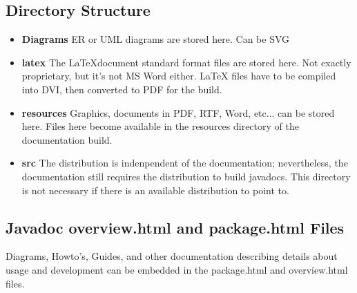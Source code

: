 \documentclass[12pt,notitlepage]{article}
\begin{document}
\begin{s5presentation}
\begin{ifhtml}
\begin{s5slide}
        \section{Directory Structure}
        \begin{itemize}
      \item \textbf{Diagrams}
        ER or UML diagrams are stored here. Can be SVG
      \item \textbf{latex}
        The \LaTeX document standard format files are stored here. Not exactly proprietary, but
        it's not MS Word either. LaTeX files have to be compiled into DVI, then converted to PDF for
        the build.
      \item \textbf{resources}
          Graphics, documents in PDF, RTF, Word, etc... can be stored here. Files here become
          available in the resources directory of the documentation build.
        \item \textbf{src}
          The distribution is indenpendent of the documentation; nevertheless, the 
          documentation still requires the distribution to build javadocs. This directory 
          is not necessary if there is an available distribution to point to.
      \end{itemize}
      \end{s5slide}
    \begin{s5slide}
      \section{Javadoc overview.html and package.html Files}
      Diagrams, Howto's, Guides, and other documentation describing details about usage and development 
      can be embedded in the package.html and overview.html files.
    \end{s5slide}
    \begin{s5slide}

\end{s5slide}
\end{ifhtml}
\end{s5presentation}
\end{document}
